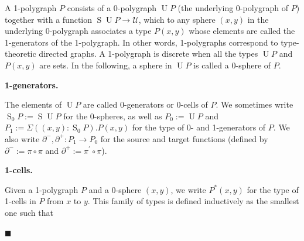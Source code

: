 \documentclass[10pt,a4paper]{amsart}
\begin{document}
 
A 1-polygraph $P$ consists of a 0-polygraph $\operatorname{U}P$ (the underlying 0-polygraph of $P$) together with a function $\operatorname{S}{\operatorname{U}P}\to\mathcal{U}$, which to any sphere $(x,y)$ in the underlying 0-polygraph associates a type $P(x,y)$ whose elements are called the 1-generators of the 1-polygraph. In other words, 1-polygraphs correspond to type-theoretic directed graphs. A 1-polygraph is discrete when all the types $\operatorname{U}P$ and $P(x,y)$ are sets. In the following, a sphere in $\operatorname{U}P$ is called a 0-sphere of $P$.\par
 
 
 
 
\par\medskip\noindent\textbf{1-generators.}\par
 
 
The elements of $\operatorname{U}P$ are called 0-generators or 0-cells of $P$. We sometimes write $\operatorname{S}_{0}P:=\operatorname{S}\operatorname{U}P$ for the 0-spheres, as well as $P_{0}:=\operatorname{U}P$ and $P_{1}:=\Sigma((x,y):\operatorname{S}_{0}P).P(x,y)$ for the type of 0- and 1-generators of $P$. We also write $\partial^{-},\partial^{+}:P_{1}\to P_{0}$ for the source and target functions (defined by $\partial^{-}:=\pi\circ\pi$ and $\partial^{+}:=\pi^{\prime}\circ\pi$).\par
 
 
 
 
\par\medskip\noindent\textbf{1-cells.}\par
 
 
Given a 1-polygraph $P$ and a $0$-sphere $(x,y)$, we write $P^{*}(x,y)$ for the type of 1-cells in $P$ from $x$ to $y$. This family of types is defined inductively as the smallest one such that\par
  
\par\noindent  $\blacksquare$ 
 
\end{document}
